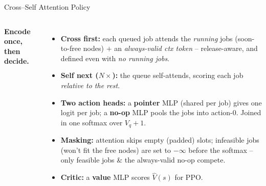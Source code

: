 \begin{frame}{Cross--Self Attention Policy}
\begin{columns}
{}

    \scriptsize
    \textbf{Encode once, then decide.}
    \begin{itemize}\setlength\itemsep{3pt}
      \item \textbf{Cross first:} each queued job attends the \emph{running}
            jobs (soon-to-free nodes) $+$ an \emph{always-valid ctx token} --
            release-aware, and defined even with \emph{no running jobs}.
      \item \textbf{Self next ($N\times$):} the queue self-attends, scoring
            each job \emph{relative to the rest}.
      \item \textbf{Two action heads:} a \textbf{pointer} MLP (shared per job)
            gives one logit per job; a \textbf{no-op} MLP pools the jobs into
            action-0. Joined in one softmax over $V_q{+}1$.
      \item \textbf{Masking:} attention skips empty (padded) slots; infeasible
            jobs (won't fit the free nodes) are set to $-\infty$ before the
            softmax -- only feasible jobs \& the always-valid no-op compete.
      \item \textbf{Critic:} a \textbf{value} MLP scores $\hat V(s)$ for PPO.
    \end{itemize}


\end{columns}
\end{frame}
